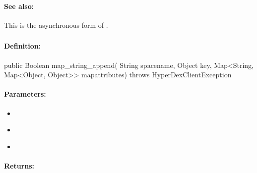 \paragraph{See also:}  This is the asynchronous form of .

\pagebreak
\subsubsection{}
\label{api:java:map_string_append}


\paragraph{Definition:}
\begin{javacode}
public Boolean map_string_append(
        String spacename,
        Object key,
        Map<String, Map<Object, Object>> mapattributes) throws HyperDexClientException
\end{javacode}

\paragraph{Parameters:}
\begin{itemize}[noitemsep]
\item {}\\

\item {}\\

\item {}\\

\end{itemize}

\paragraph{Returns:}


\pagebreak
\subsubsection{}
\label{api:java:async_map_string_append}


